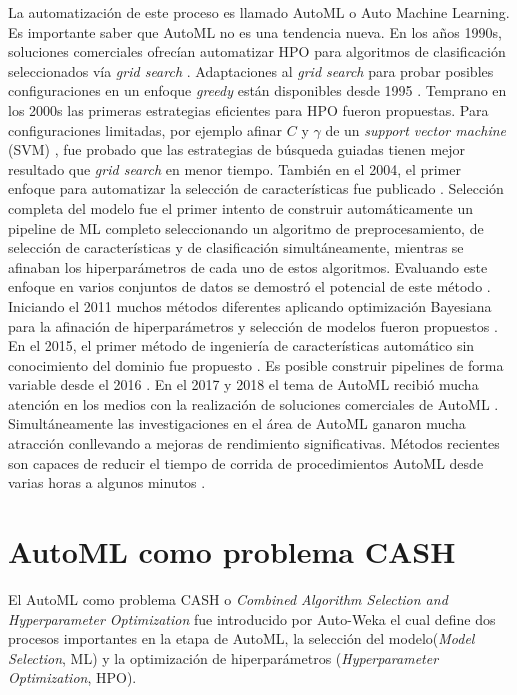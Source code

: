 La automatización de este proceso es llamado AutoML o Auto Machine Learning. Es importante saber que AutoML no es una tendencia nueva. En los años 1990s, soluciones comerciales ofrecían automatizar HPO para algoritmos de clasificación seleccionados vía \textit{grid search} \parencite{17}. Adaptaciones al \textit{grid search} para probar posibles configuraciones en un enfoque \textit{greedy} están disponibles desde 1995 \parencite{18}. Temprano en los 2000s las primeras estrategias eficientes para HPO fueron propuestas. Para configuraciones limitadas, por ejemplo afinar $C$ y $\gamma$ de un \textit{support vector machine} (SVM) \parencite{19} \parencite{20}, fue probado que las estrategias de búsqueda guiadas tienen mejor resultado que \textit {grid search} en menor tiempo. También en el 2004, el primer enfoque para automatizar la selección de características fue publicado \parencite{21}. Selección completa del modelo \parencite{22} fue el primer intento de construir automáticamente un pipeline de ML completo seleccionando un algoritmo de preprocesamiento, de selección de características y de clasificación simultáneamente, mientras se afinaban los hiperparámetros de cada uno de estos algoritmos. Evaluando este enfoque en varios conjuntos de datos se demostró el potencial de este método \parencite{23}. Iniciando el 2011 muchos métodos diferentes aplicando optimización Bayesiana para la afinación de hiperparámetros \parencite{24} \parencite{25} y selección de modelos fueron propuestos \parencite{13}. En el 2015, el primer método de ingeniería de características automático sin conocimiento del dominio fue propuesto \parencite{26}. Es posible construir pipelines de forma variable desde el 2016 \parencite{27}. En el 2017 y 2018 el tema de AutoML recibió mucha atención en los medios con la realización de soluciones comerciales de AutoML \parencite{28} \parencite{29} \parencite{30} \parencite{31}. Simultáneamente las investigaciones en el área de AutoML ganaron mucha atracción conllevando a mejoras de rendimiento significativas. Métodos recientes son capaces de reducir el tiempo de corrida de procedimientos AutoML desde varias horas a algunos minutos \parencite{32}.

\section{AutoML como problema CASH}

El AutoML como problema CASH o \textit{Combined Algorithm Selection and Hyperparameter Optimization} fue introducido por Auto-Weka el cual define dos procesos importantes en la etapa de AutoML, la selección del modelo(\textit{Model Selection}, ML) y la optimización de hiperparámetros (\textit{Hyperparameter Optimization}, HPO).


